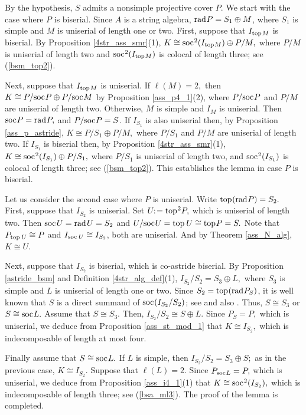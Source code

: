 \documentclass[10pt]{amsart}
\theoremstyle{definition}
\newcommand{\rad}{{\rm rad}\hspace{.5pt}}
\newcommand{\soc}{{\rm soc}\hspace{.5pt}}
\newcommand{\ntop}{{\rm top}\hspace{.5pt}}
\newcommand{\hp}{\hspace{.5pt}}
\begin{document}
\vspace{-1.5pt}

 By the hypothesis, $S$ admits a nonsimple projective cover $P.$ We start with the case where $P$ is biserial. Since $A$ is a string algebra, $\rad P=S_1\oplus M$, where $S_1$ is simple and $M$ is uniserial of length one or two. First, suppose that $I_{\ntop M}$ is biserial. By Proposition \ref{4str_ass_smr}(1), $K\cong \soc^2(I_{\ntop M})\oplus P/M,$ where  $P/M$ is uniserial of length two and $\soc^2(I_{\ntop M})$ is colocal of length three; see (\ref{bsm_top2}). %

Next, suppose that $I_{\ntop M}$ is uniserial. If $\ell(M)=2,$ then $K\cong P/\soc P \oplus P/\soc M$ by Proposition \ref{ass_p4_1}(2), where $P/\soc P$ and $P/M$ are uniserial of length two. Otherwise, $M$ is simple and $I_M$ is uniserial. Then $\soc P=\rad P,$ and $P/\soc P=S$. If $I_{S_1}$ is also uniserial then, by Proposition \ref{ass_p_astride}, $K\cong P/S_1\oplus P/M,$ where $P/S_1$ and $P/M$ are uniserial of length two. If $I_{S_1}$ is biserial then, by Proposition \ref{4str_ass_smr}(1), $K\cong \soc^2(I_{S_1}) \oplus P/S_1,$ where  $P/S_1$ is uniserial of length two, and $\soc^2(I_{S_1})$ is colocal of length three; see (\ref{bsm_top2}). %
This establishes the lemma in case $P$ is biserial.

Let us consider the second case where $P$ is uniserial. Write $\ntop (\rad P)=S_2.$ First, suppose that $I_{S_2}$ is uniserial. Set $U\!\!:\hp\hp =\ntop^2P,$ which is uniserial of length two. Then $\soc \hp U=\rad \hp U=S_2$ and $U/\soc U=\ntop \,U\cong \ntop P=S.$  Note that $P_{\ntop \, U}\cong P$ and $I_{\soc \, U}\cong I_{S_2}$, both are uniserial. And by Theorem \ref{ass_N_alg}, $K\cong U.$ 

Next, suppose that $I_{S_2}$ is biserial, which is co-astride biserial. By Proposition \ref{astride_bsm} and Definition \ref{4str_alg_def}(1), $I_{S_2}/S_2=S_3\oplus L,$ where $S_3$ is simple and $L$ is uniserial of length one or two. Since $S_2=\ntop (\rad P_S)$, it is well known that $S$ is a direct summand of $\soc(I_{S_2}/S_2)$; see \cite[(III.1.15)]{ARS} and also \cite[(1.1)]{LiY}. Thus, $S\cong S_3$ or $S\cong \soc L.$ Assume that $S\cong S_3$. Then, $I_{S_2}/S_2\cong S\oplus L.$ Since $P_S=P,$ which is uniserial, we deduce from Proposition \ref{ass_st_mod_1} that $K\cong I_{S_2},$ which is indecomposable of length at most four.

Finally assume that $S \cong \soc L.$ If $L$ is simple, then $I_{S_2}/S_2=S_3\oplus S;$ as in the previous case, $K\cong I_{S_2}.$ Suppose that $\ell(L)=2$. Since $P_{\soc L}=P,$ which is uniserial, we deduce from Proposition \ref{ass_i4_1}(1) that $K\cong \soc^2(I_{S_2}),$ which is indecomposable of length three; see (\ref{bsa_ml3}). The proof of the lemma is completed.
\end{document}
